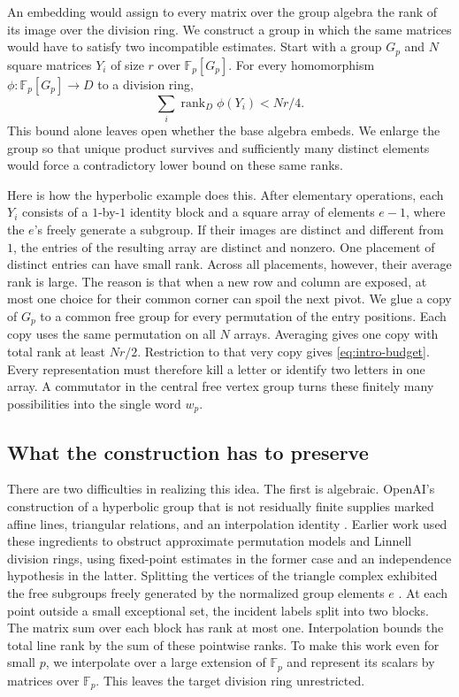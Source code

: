 \documentclass[11pt,a4paper]{article}
\numberwithin{equation}{section}
\DeclareMathOperator{\rk}{rank}
\newcommand{\F}{\mathbb F}
\begin{document}
An embedding would assign to every matrix over the group algebra the rank of its image over the division ring. We construct a group in which the same matrices would have to satisfy two incompatible estimates. Start with a group \(G_p\) and \(N\) square matrices \(Y_i\) of size \(r\) over \(\F_p[G_p]\). For every homomorphism \(\phi:\F_p[G_p]\to D\) to a division ring,
\begin{equation}\label{eq:intro-budget}
              \sum_i\rk_D\phi(Y_i)<Nr/4 .
\end{equation}
This bound alone leaves open whether the base algebra embeds. We enlarge the group so that unique product survives and sufficiently many distinct elements would force a contradictory lower bound on these same ranks.

Here is how the hyperbolic example does this. After elementary operations, each \(Y_i\) consists of a \(1\)-by-\(1\) identity block and a square array of elements \(e-1\), where the \(e\)'s freely generate a subgroup. If their images are distinct and different from \(1\), the entries of the resulting array are distinct and nonzero. One placement of distinct entries can have small rank. Across all placements, however, their average rank is large. The reason is that when a new row and column are exposed, at most one choice for their common corner can spoil the next pivot. We glue a copy of \(G_p\) to a common free group for every permutation of the entry positions. Each copy uses the same permutation on all \(N\) arrays. Averaging gives one copy with total rank at least \(Nr/2\). Restriction to that very copy gives \eqref{eq:intro-budget}. Every representation must therefore kill a letter or identify two letters in one array. A commutator in the central free vertex group turns these finitely many possibilities into the single word \(w_p\).

\subsection*{What the construction has to preserve}
There are two difficulties in realizing this idea. The first is algebraic. OpenAI's construction of a hyperbolic group that is not residually finite supplies marked affine lines, triangular relations, and an interpolation identity \cite[Lemmas~2.2--2.3 and (2.13)--(2.14)]{r20}. Earlier work used these ingredients to obstruct approximate permutation models and Linnell division rings, using fixed-point estimates in the former case and an independence hypothesis in the latter. Splitting the vertices of the triangle complex exhibited the free subgroups freely generated by the normalized group elements \(e\) \cite[Theorems~1.2 and~1.4, Proposition~6.4 and Corollary~6.5]{r9}. At each point outside a small exceptional set, the incident labels split into two blocks. The matrix sum over each block has rank at most one. Interpolation bounds the total line rank by the sum of these pointwise ranks. To make this work even for small \(p\), we interpolate over a large extension of \(\F_p\) and represent its scalars by matrices over \(\F_p\). This leaves the target division ring unrestricted.
\end{document}
